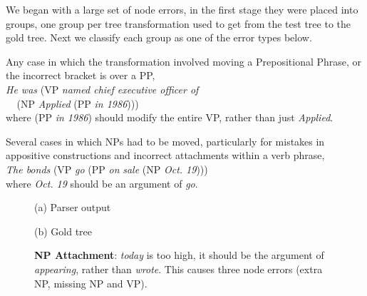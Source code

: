 We began with a large set of node errors, in the first stage they were placed
into groups, one group per tree transformation used to get from the test tree
to the gold tree.  Next we classify each group as one of the error types below.

\begin{description}\itemsep1pt
	\item[ PP Attachment] Any case in which the transformation involved moving
	a Prepositional Phrase, or the incorrect bracket is over a PP, \myeg \\ 
	\emph{He was} (VP \emph{named chief executive officer of} \\
	\textcolor{white}{fill}(NP \emph{Applied} (PP \emph{in 1986}))) \\
	where (PP \emph{in 1986}) should modify the entire VP, rather than just \emph{Applied}.

	\item[ NP Attachment] Several cases in which NPs had to be moved,
	particularly for mistakes in appositive constructions and incorrect
	attachments within a verb phrase, \myeg \\ \emph{The bonds} (VP \emph{go} (PP
	\emph{on} \emph{sale} (NP \emph{Oct.\@\xspace 19}))) \\
	where \emph{Oct.\@\xspace 19} should be an argument of \emph{go}.
\end{description}


\begin{figure}
\begin{center}

\small
(a) Parser output

\vspace{3mm}


\small
(b) Gold tree
\end{center}
\derivspace
\caption{
	\label{fig:NP-attachment}
	\textbf{NP Attachment}: \emph{today} is too high, it should be the argument
	of \emph{appearing}, rather than \emph{wrote}.  This causes three node errors
	(extra NP, missing NP and VP).
}
\derivaftercompress
\end{figure}

